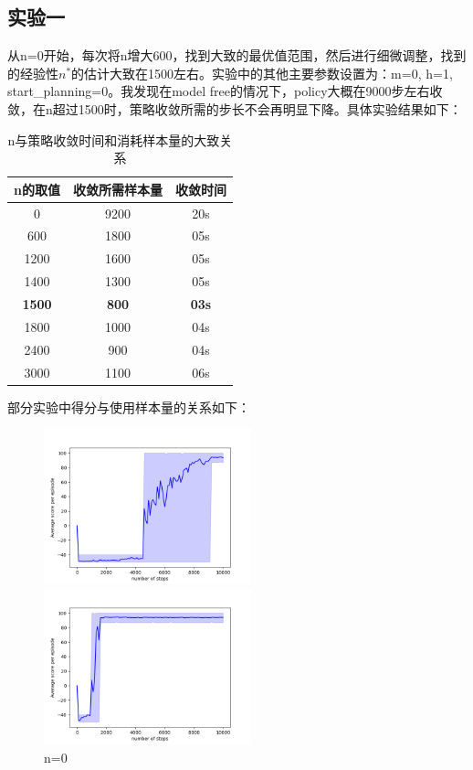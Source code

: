 \documentclass[a4paper,12pt]{article}
\begin{document}
\begin{CJK}{UTF8}{gbsn}
\subsection{实验一}
从n=0开始，每次将n增大600，找到大致的最优值范围，然后进行细微调整，找到的经验性$n^*$的估计大致在1500左右。实验中的其他主要参数设置为：m=0, h=1, start\_planning=0。我发现在model free的情况下，policy大概在9000步左右收敛，在n超过1500时，策略收敛所需的步长不会再明显下降。具体实验结果如下：
\begin{table}[H]
	\renewcommand{\arraystretch}{1.2}
	\caption{n与策略收敛时间和消耗样本量的大致关系}
	\centering
	\begin{tabular}{ccc}
		\hline
		n的取值& 收敛所需样本量& 收敛时间\\
		\hline
		0& 9200 & 20s\\
		600& 1800 & 05s\\
		1200& 1600 & 05s\\
		1400& 1300 & 05s\\
		\textbf{1500}& \textbf{800} & \textbf{03s}\\
		1800& 1000 & 04s\\
		2400& 900 & 04s\\
		3000& 1100 & 06s\\
		\hline
	\end{tabular}
\end{table}
部分实验中得分与使用样本量的关系如下：
\begin{figure}[htbp]
	\centering
	\begin{minipage}[t]{0.45\textwidth}
		\centering
		\includegraphics[width=6cm]{resource/n=0/performance.png}
		\caption{n=0}
	\end{minipage}
	\begin{minipage}[t]{0.45\textwidth}
		\centering
		\includegraphics[width=6cm]{resource/n=1200/performance.png}

\end{minipage}
\end{figure}
\end{CJK}
\end{document}
